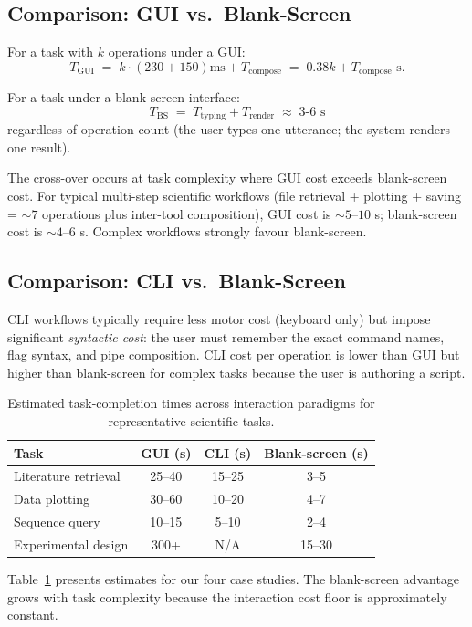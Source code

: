 \documentclass[11pt,a4paper]{article}
\theoremstyle{definition}
\theoremstyle{remark}
\begin{document}
\subsection{Comparison: GUI vs.\ Blank-Screen}

For a task with $k$ operations under a GUI:
\[
T_{\text{GUI}} \;=\; k \cdot (230 + 150)\text{ms} + T_{\text{compose}} \;=\; 0.38k + T_{\text{compose}}\text{ s}.
\]

For a task under a blank-screen interface:
\[
T_{\text{BS}} \;=\; T_{\text{typing}} + T_{\text{render}} \;\approx\; 3\text{-}6\text{ s}
\]
regardless of operation count (the user types one utterance; the system renders one result).

The cross-over occurs at task complexity where GUI cost exceeds blank-screen cost. For typical multi-step scientific workflows (file retrieval + plotting + saving = $\sim 7$ operations plus inter-tool composition), GUI cost is $\sim 5$--$10$ s; blank-screen cost is $\sim 4$--$6$ s. Complex workflows strongly favour blank-screen.

\subsection{Comparison: CLI vs.\ Blank-Screen}

CLI workflows typically require less motor cost (keyboard only) but impose significant \emph{syntactic cost}: the user must remember the exact command names, flag syntax, and pipe composition. CLI cost per operation is lower than GUI but higher than blank-screen for complex tasks because the user is authoring a script.

\begin{table}[t]
\centering
\small
\begin{tabular}{lccc}
\toprule
Task & GUI (s) & CLI (s) & Blank-screen (s) \\
\midrule
Literature retrieval & 25--40 & 15--25 & 3--5 \\
Data plotting & 30--60 & 10--20 & 4--7 \\
Sequence query & 10--15 & 5--10 & 2--4 \\
Experimental design & 300+ & N/A & 15--30 \\
\bottomrule
\end{tabular}
\caption{Estimated task-completion times across interaction paradigms for representative scientific tasks.}
\label{tab:times}
\end{table}

Table~\ref{tab:times} presents estimates for our four case studies. The blank-screen advantage grows with task complexity because the interaction cost floor is approximately constant.
\end{document}
